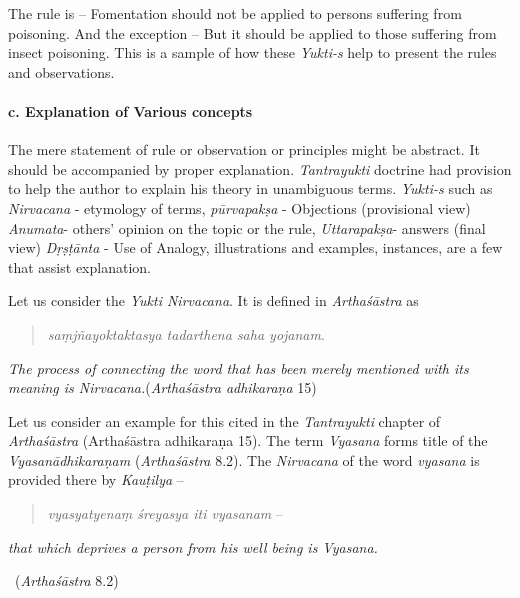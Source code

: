 The rule is – Fomentation should not be applied to persons suffering from poisoning. And the exception – But it should be applied to those suffering from insect poisoning. This is a sample of how these \textit{Yukti-s} help to present the rules and observations.


\paragraph*{c. Explanation of Various concepts}

The mere statement of rule or observation or principles might be abstract. It should be accompanied by proper explanation. \textit{Tantrayukti} doctrine had provision to help the author to explain his theory in unambiguous terms. \textit{Yukti-s} such as \textit{Nirvacana} - etymology of terms, \textit{pūrvapakṣa} - Objections (provisional view) \textit{Anumata}- others’ opinion on the topic or the rule, \textit{Uttarapakṣa}- answers (final view) \textit{Dṛṣṭānta} - Use of Analogy, illustrations and examples, instances, are a few that assist explanation.

Let us consider the \textit{Yukti Nirvacana}. It is defined in \textit{Arthaśāstra} as

\begin{quote}
\textit{saṃjñayoktaktasya tadarthena saha yojanam}.
\end{quote}

\begin{myquote}
\textit{The process of connecting the word that has been merely mentioned with its meaning is Nirvacana.}\hfill (\textit{Arthaśāstra adhikaraṇa} 15)
\end{myquote}

Let us consider an example for this cited in the \textit{Tantrayukti} chapter of \textit{Arthaśāstra} (Arthaśāstra adhikaraṇa 15). The term \textit{Vyasana} forms title of the \textit{Vyasanādhikaraṇam} (\textit{Arthaśāstra} 8.2). The \textit{Nirvacana} of the word \textit{vyasana} is provided there by \textit{Kauṭilya} –

\begin{verse}
\textit{vyasyatyenaṃ śreyasya iti vyasanam} –
\end{verse}

\begin{myquote}
\textit{that which deprives a person from his well being is Vyasana.}

~\hfill (\textit{Arthaśāstra} 8.2)
\end{myquote}


